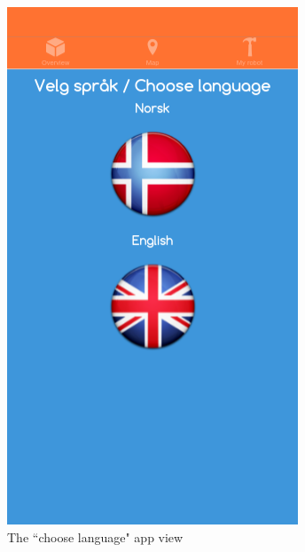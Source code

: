 \begin{figure}[H]
  \begin{minipage}[t]{0.35\textwidth}
    \includegraphics[width=\textwidth]{images/app/chooseLanguage.png}
    \caption{The ``choose language" app view}
    \label{fig:choose_lang}
  \end{minipage}
  \hfill
  \begin{minipage}[t]{0.35\textwidth}

\end{minipage}
\end{figure}
